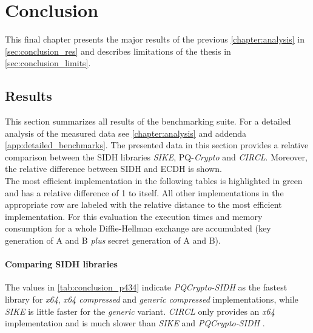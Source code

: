 \chapter{Conclusion}\label{chapter:conclusion}

This final chapter presents the major results of the previous \autoref{chapter:analysis} in \autoref{sec:conclusion_res} and describes limitations of the thesis in \autoref{sec:conclusion_limits}.

\section{Results}\label{sec:conclusion_res}

This section summarizes all results of the benchmarking suite. For a detailed analysis of the measured data see \autoref{chapter:analysis} and addenda \ref{app:detailed_benchmarks}. The presented data in this section provides a relative comparison between the \gls{SIDH} libraries \textit{\gls{SIKE}}, PQ-\textit{Crypto} and \textit{\gls{CIRCL}}. Moreover, the relative difference between \gls{SIDH} and \gls{ECDH} is shown.\\
The most efficient implementation in the following tables is highlighted in green and has a relative difference of 1 to itself. All other implementations in the appropriate row are labeled with the relative distance to the most efficient implementation. For this evaluation the execution times and memory consumption for a whole Diffie-Hellman exchange are accumulated (key generation of A and B \textit{plus} secret generation of A and B).

\subsubsection{Comparing \gls{SIDH} libraries}

The values in \autoref{tab:conclusion_p434} indicate \textit{\gls{PQCrypto-SIDH} } as the fastest library for \textit{x64}, \textit{x64 compressed} and \textit{generic compressed} implementations, while \textit{\gls{SIKE}} is little faster for the \textit{generic} variant. \textit{\gls{CIRCL}} only provides an \textit{x64} implementation and is much slower than \textit{\gls{SIKE}} and \textit{\gls{PQCrypto-SIDH} }.

